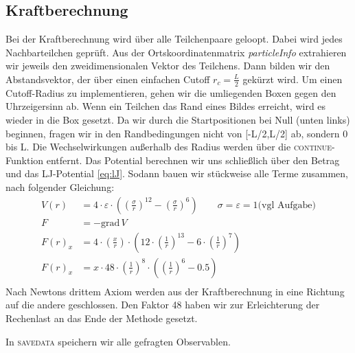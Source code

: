 \subsection*{Kraftberechnung}
Bei der Kraftberechnung wird über alle Teilchenpaare geloopt. Dabei wird jedes Nachbarteilchen geprüft. Aus der Ortskoordinatenmatrix \textit{particleInfo} extrahieren wir jeweils den zweidimensionalen Vektor des Teilchens. Dann bilden wir den Abstandsvektor, der über einen einfachen Cutoff $r_c = \frac{L}{2}$ gekürzt wird. Um einen Cutoff-Radius zu implementieren, gehen wir die umliegenden Boxen gegen den Uhrzeigersinn ab. Wenn ein Teilchen das Rand eines Bildes erreicht, wird es wieder in die Box gesetzt. Da wir durch die Startpositionen bei Null (unten links) beginnen, fragen wir in den Randbedingungen nicht von [-L/2,L/2] ab, sondern 0 bis L.
Die Wechselwirkungen außerhalb des Radius werden über die \textsc{continue}-Funktion entfernt. Das Potential berechnen wir uns schließlich über den Betrag und das LJ-Potential \eqref{eq:lJ}. Sodann bauen wir stückweise alle Terme zusammen, nach folgender Gleichung:
\begin{equation*}
\begin{split}
	V(r) &= 4\cdot \varepsilon \cdot \left( \left( \frac{\sigma}{r} \right)^12 - \left( \frac{\sigma}{r} \right)^6 \right) \qquad \sigma = \varepsilon = 1 \text{(vgl Aufgabe)} \\
		F &= -\text{grad} \,V\\
        F(r)_x &= 4 \cdot \left(\frac{x}{r}\right) \cdot \left(12\cdot\left(\frac{1}{r}\right)^{13} - 6\cdot\left(\frac{1}{r}\right)^7\right) \\
            F(r)_x &= x \cdot 48 \cdot \left( \frac{1}{r} \right)^8 \cdot \left(\left(\frac{1}{r}\right)^6 - 0.5\right) \\
\end{split}
\end{equation*}
Nach Newtons drittem Axiom werden aus der Kraftberechnung in eine Richtung auf die andere geschlossen. Den Faktor 48 haben wir zur Erleichterung der Rechenlast an das Ende der Methode gesetzt.

In \textsc{savedata} speichern wir alle gefragten Observablen.

